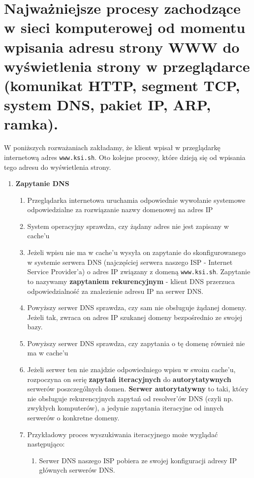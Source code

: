 \documentclass[12pt]{article}
\begin{document}
    \section{Najważniejsze procesy zachodzące w sieci komputerowej od momentu wpisania adresu strony WWW do wyświetlenia strony w przeglądarce (komunikat HTTP, segment TCP, system DNS, pakiet IP, ARP, ramka).}
    W poniższych rozważaniach zakładamy, że klient wpisał w przeglądarkę internetową adres \texttt{www.ksi.sh}.
    Oto kolejne procesy, które dzieją się od wpisania tego adresu do wyświetlenia strony.
    \begin{enumerate}
        \item \textbf{Zapytanie DNS}
        \begin{enumerate}
            \item Przeglądarka internetowa uruchamia odpowiednie wywołanie systemowe odpowiedzialne za rozwiązanie nazwy domenowej na adres IP
            \item System operacyjny sprawdza, czy żądany adres nie jest zapisany w cache'u
            \item Jeżeli wpisu nie ma w cache'u wysyła on zapytanie do skonfigurowanego w systemie serwera DNS (najczęściej serwera naszego ISP - Internet Service Provider'a) o adres IP związany z domeną \texttt{www.ksi.sh}.
                  Zapytanie to nazywamy \textbf{zapytaniem rekurencyjnym} - klient DNS przerzuca odpowiedzialność za znalezienie adresu IP na serwer DNS.
            \item Powyższy serwer DNS sprawdza, czy sam nie obsługuje żądanej domeny. Jeżeli tak, zwraca on adres IP szukanej domeny bezpośrednio ze swojej bazy.
            \item Powyższy serwer DNS sprawdza, czy zapytania o tę domenę również nie ma w cache'u
            \item Jeżeli serwer ten nie znajdzie odpowiedniego wpisu w swoim cache'u, rozpoczyna on serię \textbf{zapytań iteracyjnych} do \textbf{autorytatywnych} serwerów poszczególnych domen.
                  \textbf{Serwer autorytatywny} to taki, który nie obsługuje rekurencyjnych zapytań od resolver'ów DNS (czyli np. zwykłych komputerów), a jedynie zapytania iteracyjne od innych serwerów o konkretne domeny.
            \item Przykładowy proces wyszukiwania iteracyjnego może wyglądać następująco:
            \begin{enumerate}
                \item Serwer DNS naszego ISP pobiera ze swojej konfiguracji adresy IP głównych serwerów DNS.

\end{enumerate}
\end{enumerate}
\end{enumerate}
\end{document}
